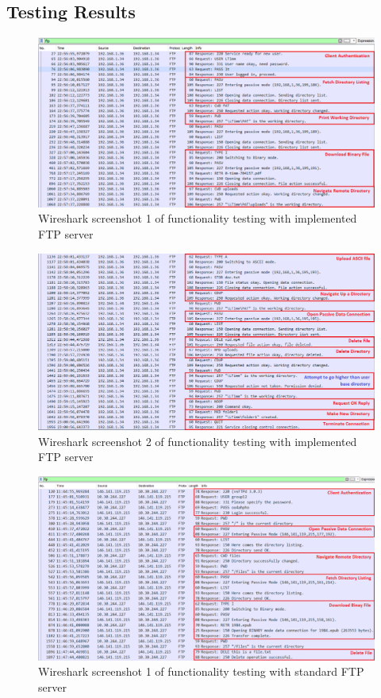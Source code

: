\documentclass[10pt,twocolumn]{witseiepaper}
\begin{document}
\begin{appendix}
\newpage

\section{Testing Results}\label{sec:wireshark}
\setcounter{figure}{0} \renewcommand{\thefigure}{C\arabic{figure}}

\begin{figure}[h]
	\centering
	\includegraphics[width=0.9\columnwidth]{ClientServer1anno.png}
	\caption{Wireshark screenshot 1 of functionality testing with implemented FTP server}
	\raggedright
	\label{fig:ourWS1}
\end{figure}

\begin{figure}[h]
	\centering
	\includegraphics[width=0.9\columnwidth]{ClientServer2anno.png}
	\caption{Wireshark screenshot 2 of functionality testing with implemented FTP server}
	\raggedright
	\label{fig:ourWS2}
\end{figure}

\begin{figure}[h]
	\centering
	\includegraphics[width=0.9\columnwidth]{WitsCaptureAnno2.png}
	\caption{Wireshark screenshot 1 of functionality testing with standard FTP server}
	\raggedright
	\label{fig:WitsWS1}
\end{figure}


\end{appendix}
\end{document}
